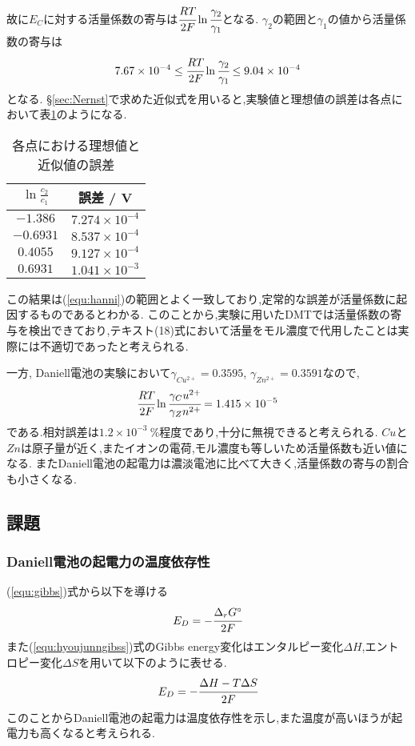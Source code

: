 故に$E_C$に対する活量係数の寄与は$\cfrac{RT}{2F}\ln \cfrac{\gamma_2}{\gamma_1}$となる. $\gamma_2$の範囲と$\gamma_1$の値から活量係数の寄与は
\begin{equation}
  \label{equ:hanni}
  7.67\times10^{-4} \leq \cfrac{RT}{2F}\ln \cfrac{\gamma_2}{\gamma_1} \leq 9.04\times10^{-4}
\end{equation}
となる. \S\ref{sec:Nernst}で求めた近似式を用いると,実験値と理想値の誤差は各点において表\ref{tab:gosa}のようになる.
\newpage
\begin{table}[h]
   \caption{各点における理想値と近似値の誤差}
   \label{tab:gosa}
   \centering
   \begin{tabular}{c|c}
     \hline
     $\ln \frac{c_2}{c_1}$&誤差 / \si{\volt}\\
     \hline \hline
     $-1.386$&$7.274\times10^{-4}$\\
     $-0.6931$&$8.537\times10^{-4}$\\
     $0.4055$&$9.127\times10^{-4}$\\
     $0.6931$&$1.041\times10^{-3}$\\
     \hline
   \end{tabular}
\end{table}
この結果は(\ref{equ:hanni})の範囲とよく一致しており,定常的な誤差が活量係数に起因するものであるとわかる.
このことから,実験に用いたDMTでは活量係数の寄与を検出できており,テキスト(18)式において活量をモル濃度で代用したことは実際には不適切であったと考えられる.

一方, Daniell電池の実験において$\gamma_{Cu^{2+}}=0.3595$, $\gamma_{Zn^{2+}}=0.3591$なので,
\begin{equation*}
  \cfrac{RT}{2F} \ln \cfrac{\gamma_Cu^{2+}}{\gamma_Zn^{2+}}=1.415\times10^{-5}
\end{equation*}
である.相対誤差は$1.2\times10^{-3}\ \%$程度であり,十分に無視できると考えられる.
$Cu$と$Zn$は原子量が近く,またイオンの電荷,モル濃度も等しいため活量係数も近い値になる.
またDaniell電池の起電力は濃淡電池に比べて大きく,活量係数の寄与の割合も小さくなる.

\subsection{課題}
\subsubsection{Daniell電池の起電力の温度依存性}
(\ref{equ:gibbs})式から以下を導ける
\begin{equation}
  \label{equ:hyoujunngibss}
  E_D=-\cfrac{\Delta_rG^{\circ}}{2F}
\end{equation}
また(\ref{equ:hyoujunngibss})式のGibbs energy変化はエンタルピー変化$\Delta H$,エントロピー変化$\Delta S$を用いて以下のように表せる\cite{jiten}.
\begin{equation}
  \label{equ:enen}
  E_D=-\cfrac{\Delta H - T\Delta S}{2F}
\end{equation}
このことからDaniell電池の起電力は温度依存性を示し,また温度が高いほうが起電力も高くなると考えられる.
